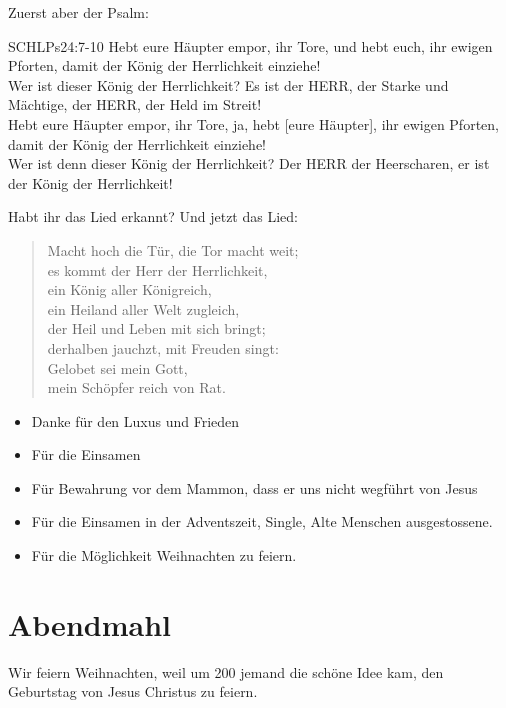 \documentclass[fontsize=16pt]{mybib}
\begin{document}
Zuerst aber der Psalm:
\begin{bibelbox}{SCHL}{Ps}{24:7-10}
Hebt eure Häupter empor, ihr Tore, und hebt euch, ihr ewigen Pforten, damit der König der Herrlichkeit einziehe!\\ Wer ist dieser König der Herrlichkeit? Es ist der HERR, der Starke und Mächtige, der HERR, der Held im Streit!\\ Hebt eure Häupter empor, ihr Tore, ja, hebt [eure Häupter], ihr ewigen Pforten, damit der König der Herrlichkeit einziehe!\\ Wer ist denn dieser König der Herrlichkeit? Der HERR der Heerscharen, er ist der König der Herrlichkeit!
\end{bibelbox}
Habt ihr das Lied erkannt? Und jetzt das Lied:
\begin{verse}
  Macht hoch die Tür, die Tor macht weit;\\
 es kommt der Herr der Herrlichkeit,\\
 ein König aller Königreich,\\
 ein Heiland aller Welt zugleich,\\
 der Heil und Leben mit sich bringt;\\
 derhalben jauchzt, mit Freuden singt:\\
 Gelobet sei mein Gott,\\
 mein Schöpfer reich von Rat.\\
\end{verse}

\begin{itemize}
  \item Danke für den Luxus und Frieden
  \item Für die Einsamen
  \item Für Bewahrung vor dem Mammon, dass er uns nicht wegführt von Jesus
  \item Für die Einsamen in der Adventszeit, Single, Alte Menschen ausgestossene.
  \item Für die Möglichkeit Weihnachten zu feiern.
\end{itemize}

\newpage

\section{Abendmahl}
Wir feiern Weihnachten, weil um 200\nChr{} jemand die schöne Idee kam, den Geburtstag von Jesus Christus zu feiern.
\end{document}

